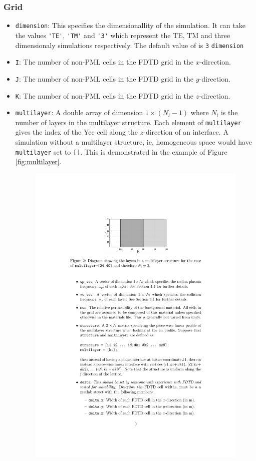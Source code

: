 \documentclass[a4paper, 12pt]{article}
\begin{document}
	\subsubsection{Grid}
	\begin{itemize}
		\item \verb+dimension+: This specifies the dimensionallity of the
		simulation. It can take the values \verb+'TE'+, \verb+'TM'+ and
		\verb+'3'+ which represent the TE, TM and three dimensionaly
		simulations respectively. The default value of is   \verb+3+ \verb+dimension+
		\item \verb+I+: The number of non-PML cells in the FDTD grid in the
		$x$-direction.
		\item \verb+J+: The number of non-PML cells in the FDTD grid in the
		$y$-direction.
		\item \verb+K+: The number of non-PML cells in the FDTD grid in the
		$z$-direction.
		\item \verb+multilayer+: A double array of dimension $1\times (N_l-1)$
		where $N_l$ is the number of layers in the multilayer
		structure. Each element of \verb+multilayer+ gives the index of the
		Yee cell along the $z$-direction of an interface. A simulation
		without a multilayer structure, ie, homogeneous space would have
		\verb+multilayer+ set to \verb+[]+. This is demonstrated in the
		example of Figure \ref{fig:multilayer}.\begin{figure}[h]
			\begin{center}
				\includegraphics[width=\textwidth]{figures/1.pdf}

\end{center}
\end{figure}
\end{itemize}
\end{document}
